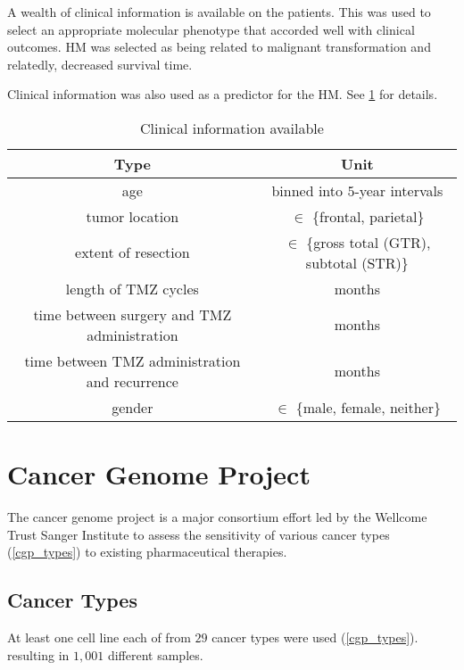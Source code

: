 A wealth of clinical information is available on the patients. This
was used to select an appropriate molecular phenotype that accorded
well with clinical outcomes. HM was selected as being
related to malignant transformation and relatedly, decreased survival
time.

Clinical information was also used as a predictor for the HM. See
\ref{avail_clin} for details.


  \begin{table}
    \begin{center}
      \begin{tabular}{|c|c|} \hline \textbf{Type} &
        \textbf{Unit} \\ \hline
        age & binned into $5$-year intervals \\
        tumor location & $\in$ \{frontal, parietal\} \\
        extent of resection & $\in$ \{gross total (GTR), subtotal (STR)\} \\
        length of TMZ cycles & months \\
        time between surgery and TMZ administration & months \\
        time between TMZ administration and recurrence & months \\
        gender & $\in$ \{male, female, neither\}\\ \hline 
      \end{tabular}
    \end{center}
    \caption{Clinical information available} \label{avail_clin}
  \end{table}


\section{Cancer Genome Project}

The cancer genome project is a major consortium effort led by the Wellcome
Trust Sanger Institute to assess the sensitivity of various cancer
types (\ref{cgp_types}) to existing pharmaceutical therapies.


\subsection{Cancer Types}

At least one cell line each of from $29$ cancer types were used (\ref{cgp_types}).
resulting in $1,001$ different samples. 

